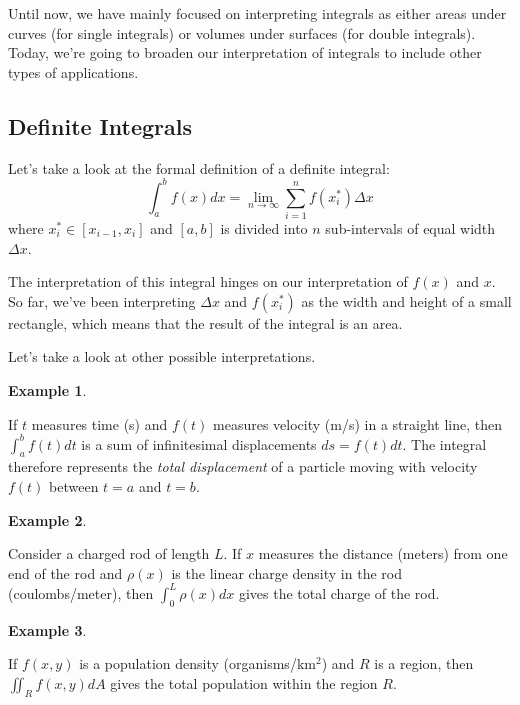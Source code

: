 \documentclass[
]{book}
\theoremstyle{definition}
\theoremstyle{definition}
\newtheorem{example}{Example}[chapter]
\theoremstyle{definition}
\theoremstyle{definition}
\theoremstyle{remark}
\begin{document}
Until now, we have mainly focused on interpreting integrals as either areas under curves (for single integrals) or volumes under surfaces (for double integrals). Today, we're going to broaden our interpretation of integrals to include other types of applications.

\hypertarget{definite-integrals}{%
\subsection{Definite Integrals}\label{definite-integrals}}

Let's take a look at the formal definition of a definite integral: \[\int_a^b f(x) dx = \lim_{n\to\infty}\sum_{i=1}^nf(x_i^*)\Delta x\]
where \(x_i^*\in[x_{i-1}, x_i]\) and \([a,b]\) is divided into \(n\) sub-intervals of equal width \(\Delta x\).

The interpretation of this integral hinges on our interpretation of \(f(x)\) and \(x\). So far, we've been interpreting \(\Delta x\) and \(f(x_i^*)\) as the width and height of a small rectangle, which means that the result of the integral is an area.

Let's take a look at other possible interpretations.

\begin{example}
\protect\hypertarget{exm:unlabeled-div-106}{}\label{exm:unlabeled-div-106}

If \(t\) measures time (s) and \(f(t)\) measures velocity (m/s) in a straight line, then \(\displaystyle \int_a^b f(t) dt\) is a sum of infinitesimal displacements \(ds=f(t) dt\). The integral therefore represents the \emph{total displacement} of a particle moving with velocity \(f(t)\) between \(t=a\) and \(t=b\).

\end{example}

\begin{example}
\protect\hypertarget{exm:unlabeled-div-107}{}\label{exm:unlabeled-div-107}

Consider a charged rod of length \(L\). If \(x\) measures the distance (meters) from one end of the rod and \(\rho (x)\) is the linear charge density in the rod (coulombs/meter), then \(\displaystyle \int_0^L \rho(x) dx\) gives the total charge of the rod.

\end{example}

\begin{example}
\protect\hypertarget{exm:unlabeled-div-108}{}\label{exm:unlabeled-div-108}

If \(f(x,y)\) is a population density (organisms/km\(^2\)) and \(R\) is a region, then \(\displaystyle \iint_R f(x,y)dA\) gives the total population within the region \(R\).

\end{example}
\end{document}
